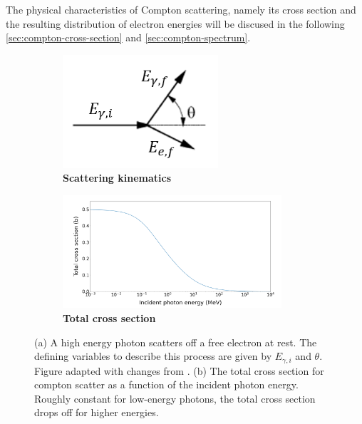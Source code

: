 The physical characteristics of Compton scattering, namely its cross section and
the resulting distribution of electron energies will be discused in the following
\autoref{sec:compton-cross-section} and \autoref{sec:compton-spectrum}.

\begin{figure}
\centering
\begin{subfigure}[h]{0.5\linewidth}
\centering
\includegraphics[height=4.2cm]{fig/compton-scattering.png}
\caption{\textbf{Scattering kinematics}\label{fig:compton-scattering}}
\end{subfigure}%
\begin{subfigure}[h]{0.5\linewidth}
\centering
\includegraphics[height=4.2cm]{fig/compton-cross-section.png}
\caption{\textbf{Total cross section}\label{fig:compton-cross-section}}
\end{subfigure}%
\caption*{(a) A high energy photon scatters off a free electron at
rest. The defining variables to describe this process are given by $E_{\gamma,i}$
and $\theta$. Figure adapted with changes from \cite{Sch17}.
(b) The total cross section for compton scatter as a function of the incident photon 
energy. Roughly constant for low-energy photons, the total cross section drops off
for higher energies.}
\end{figure}

\newpage
